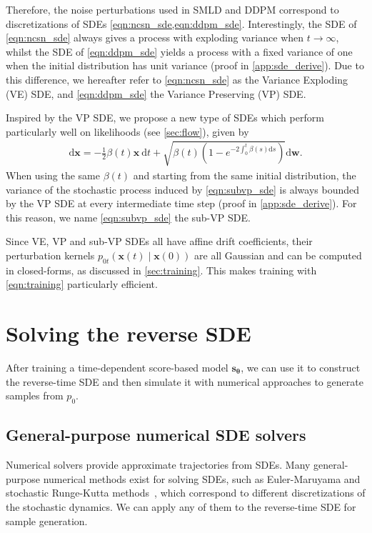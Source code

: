 \documentclass{article} \usepackage{iclr2021_conference,times}
\newcommand{\ud}{\mathrm{d}}
\newcommand{\bfx}{\mathbf{x}}
\newcommand{\bfw}{\mathbf{w}}
\newcommand{\bftheta}{{\boldsymbol{\theta}}}
\newcommand{\bfs}{\mathbf{s}}
\begin{document}
Therefore, the noise perturbations used in SMLD and DDPM correspond to discretizations of SDEs \cref{eqn:ncsn_sde,eqn:ddpm_sde}. Interestingly, the SDE of \cref{eqn:ncsn_sde} always gives a process with exploding variance when $t \to \infty$, whilst the SDE of \cref{eqn:ddpm_sde} yields a process with a fixed variance of one when the initial distribution has unit variance (proof in \cref{app:sde_derive}). Due to this difference, we hereafter refer to \cref{eqn:ncsn_sde} as the Variance Exploding (VE) SDE, and \cref{eqn:ddpm_sde} the Variance Preserving (VP) SDE. 

Inspired by the VP SDE, we propose a new type of SDEs which perform particularly well on likelihoods (see \cref{sec:flow}), given by
\begin{align}
    \ud \bfx = -\frac{1}{2}\beta(t) \bfx~ \ud t + \sqrt{\beta(t)(1 - e^{-2\int_0^t \beta(s)\ud s})} \ud \bfw.\label{eqn:subvp_sde}
\end{align}
When using the same $\beta(t)$ and starting from the same initial distribution, the variance of the stochastic process induced by \cref{eqn:subvp_sde} is always bounded by the VP SDE at every intermediate time step (proof in \cref{app:sde_derive}). For this reason, we name \cref{eqn:subvp_sde} the sub-VP SDE.

Since VE, VP and sub-VP SDEs all have affine drift coefficients, their perturbation kernels $p_{0t}(\bfx(t) \mid \bfx(0))$ are all Gaussian and can be computed in closed-forms, as discussed in \cref{sec:training}. This makes training with \cref{eqn:training} particularly efficient. 







 \section{Solving the reverse SDE}
After training a time-dependent score-based model $\bfs_\bftheta$, we can use it to construct the reverse-time SDE and then simulate it with numerical approaches to generate samples from $p_0$. 

\subsection{General-purpose numerical SDE solvers}

Numerical solvers provide approximate trajectories from SDEs. Many general-purpose numerical methods exist for solving SDEs, such as Euler-Maruyama and stochastic Runge-Kutta methods~\citep{kloeden2013numerical}, which correspond to different discretizations of the stochastic dynamics. We can apply any of them to the reverse-time SDE for sample generation. 
\end{document}
